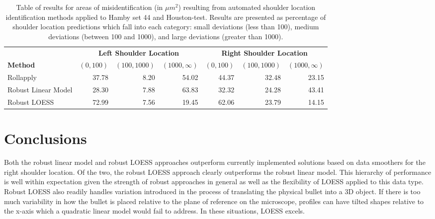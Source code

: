 \documentclass[12pt]{article}
\begin{document}
\begin{table}[]
\centering
\begin{tabular}{lrrr|rrr}
& \multicolumn{3}{c}{\textbf{Left Shoulder Location}} & \multicolumn{3}{c}{\textbf{Right Shoulder Location}} \\
\textbf{Method} & $(0,100)$ & $ (100, 1000) $ & $(1000, \infty)$ & $(0,100)$ & $ (100, 1000) $ & $(1000, \infty)$ \\ \hline
Rollapply & 37.78 & 8.20 & 54.02 & 44.37& 32.48&23.15  \\ \hline
Robust Linear Model & 28.30 & 7.88 & 63.83 & 32.32 & 24.28&43.41 \\ \hline
Robust LOESS & 72.99 & 7.56 & 19.45 & 62.06& 23.79&14.15\\ \hline
\end{tabular}
\caption{Table of results for areas of misidentification (in $\mu m^2$) resulting from automated shoulder location identification methods applied to Hamby set 44 and Houston-test. Results are presented as percentage of shoulder location predictions which fall into each category: small deviations (less than 100), medium deviations (between 100 and 1000), and large deviations (greater than 1000).}
\label{results-table}
\end{table}

\section{Conclusions}

{\color{teal}{Need to update this description because Robust Linear does worse for Houston-test...}}
Both the robust linear model and robust LOESS approaches outperform
currently implemented solutions based on data smoothers for the right
shoulder location. Of the two, the robust LOESS approach clearly
outperforms the robust linear model. This hierarchy of performance is
well within expectation given the strength of robust approaches in
general as well as the flexibility of LOESS applied to this data type.
Robust LOESS also readily handles variation introduced in the process of
translating the physical bullet into a 3D object. If there is too much
variability in how the bullet is placed relative to the plane of
reference on the microscope, profiles can have tilted shapes relative to
the x-axis which a quadratic linear model would fail to address. In
these situations, LOESS excels.
\end{document}
